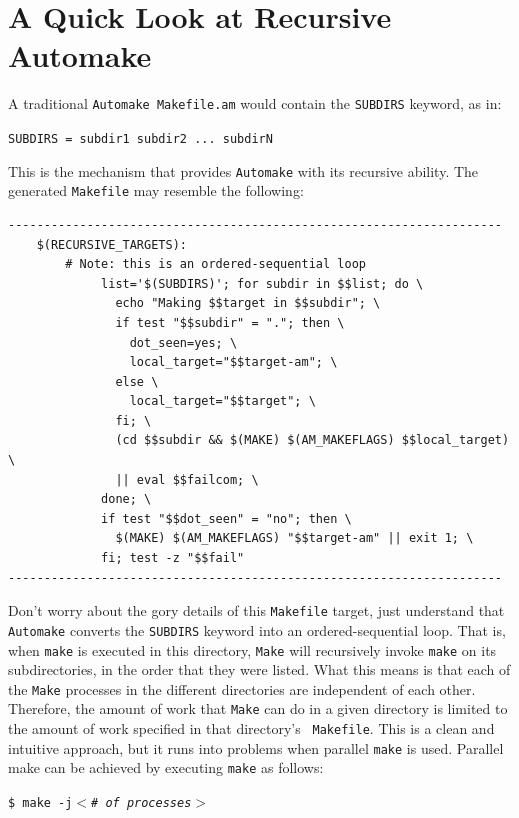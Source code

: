     \section{A Quick Look at Recursive Automake}

%
A traditional \texttt{Automake Makefile.am} would contain the \texttt{SUBDIRS} keyword, as in:
\newline\newline
\begin{indent}
    \texttt{SUBDIRS = subdir1 subdir2 ... subdirN}
\end{indent}
\newline\newline
This is the mechanism that provides \texttt{Automake} with its recursive ability. The generated
\texttt{Makefile} may resemble the following:
    \begin{verbatim}
---------------------------------------------------------------------
    $(RECURSIVE_TARGETS):
        # Note: this is an ordered-sequential loop
             list='$(SUBDIRS)'; for subdir in $$list; do \
               echo "Making $$target in $$subdir"; \
               if test "$$subdir" = "."; then \
                 dot_seen=yes; \
                 local_target="$$target-am"; \
               else \
                 local_target="$$target"; \
               fi; \
               (cd $$subdir && $(MAKE) $(AM_MAKEFLAGS) $$local_target) \
               || eval $$failcom; \
             done; \
             if test "$$dot_seen" = "no"; then \
               $(MAKE) $(AM_MAKEFLAGS) "$$target-am" || exit 1; \
             fi; test -z "$$fail"
---------------------------------------------------------------------
    \end{verbatim}

Don't worry about the gory details of this \texttt{Makefile} target, just understand that \texttt{Automake}
converts the \texttt{SUBDIRS} keyword into an ordered-sequential loop. That is, when \texttt{make} is
executed in this directory, \texttt{Make} will recursively invoke \texttt{make} on its subdirectories,
in the order that they were listed. What this means is that each of the \texttt{Make} processes in the
different directories are independent of each other. Therefore, the amount of work that \texttt{Make}
can do in a given directory is limited to the amount of work specified in that directory's \texttt{
Makefile}. This is a clean and intuitive approach, but it runs into problems when parallel \texttt{make}
is used. Parallel make can be achieved by executing \texttt{make} as follows:
    \newline\newline
    \begin{indent}
    \texttt{\$ make -j\textsl{$<$\# of processes$>$}}
    \end{indent}
    \newline\newline


